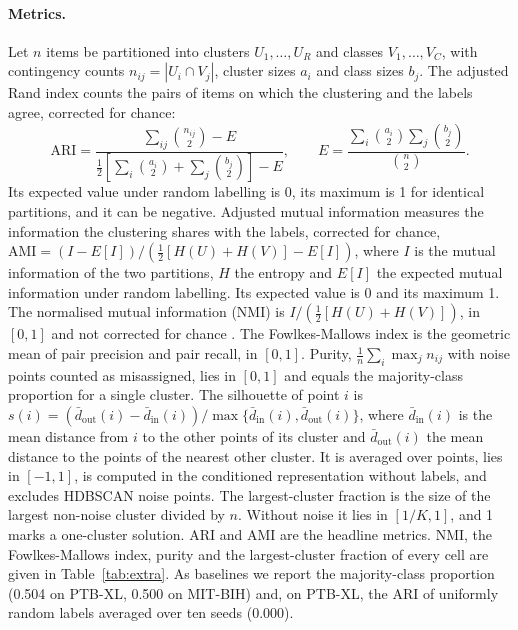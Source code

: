 \documentclass[preprint,11pt]{elsarticle}
\begin{document}
\paragraph{Metrics.} Let $n$ items be partitioned into clusters $U_1,\dots,U_R$ and
classes $V_1,\dots,V_C$, with contingency counts $n_{ij}=|U_i \cap V_j|$, cluster sizes
$a_i$ and class sizes $b_j$. The adjusted Rand index \cite{hubertarabie1985} counts the
pairs of items on which the clustering and the labels agree, corrected for chance:
\begin{equation}
\mathrm{ARI}=\frac{\sum_{ij}\binom{n_{ij}}{2}-E}
{\frac{1}{2}\left[\sum_i\binom{a_i}{2}+\sum_j\binom{b_j}{2}\right]-E},
\qquad
E=\frac{\sum_i\binom{a_i}{2}\sum_j\binom{b_j}{2}}{\binom{n}{2}}.
\end{equation}
Its expected value under random labelling is 0, its maximum is 1 for identical partitions,
and it can be negative. Adjusted mutual information \cite{vinh2010} measures the
information the clustering shares with the labels, corrected for chance,
$\mathrm{AMI}=(I-E[I])/(\frac{1}{2}[H(U)+H(V)]-E[I])$, where $I$ is the mutual
information of the two partitions, $H$ the entropy and $E[I]$ the expected mutual
information under random labelling. Its expected value is 0 and its maximum 1. The
normalised mutual information (NMI) is $I/(\frac{1}{2}[H(U)+H(V)])$, in $[0,1]$ and not
corrected for chance \cite{vinh2010}. The Fowlkes-Mallows index \cite{fowlkes1983} is the
geometric mean of pair precision and pair recall, in $[0,1]$. Purity,
$\frac{1}{n}\sum_i \max_j n_{ij}$ with noise points counted as misassigned, lies in
$[0,1]$ and equals the majority-class proportion for a single cluster. The silhouette
\cite{rousseeuw1987} of point $i$ is
$s(i)=(\bar d_{\mathrm{out}}(i)-\bar d_{\mathrm{in}}(i))/\max\{\bar d_{\mathrm{in}}(i),\bar d_{\mathrm{out}}(i)\}$,
where $\bar d_{\mathrm{in}}(i)$ is the mean distance from $i$ to the other points of its
cluster and $\bar d_{\mathrm{out}}(i)$ the mean distance to the points of the nearest other
cluster. It is averaged over points, lies in $[-1,1]$, is computed in the conditioned
representation without labels, and excludes HDBSCAN noise points. The largest-cluster
fraction is the size of the largest non-noise cluster divided by $n$. Without noise it
lies in $[1/K,1]$, and 1 marks a one-cluster solution. ARI and AMI are the headline
metrics. NMI, the Fowlkes-Mallows index, purity and the largest-cluster fraction of every
cell are given in Table~\ref{tab:extra}. As
baselines we report the majority-class proportion (0.504 on PTB-XL, 0.500 on MIT-BIH)
and, on PTB-XL, the ARI of uniformly random labels averaged over ten seeds (0.000).
\end{document}
